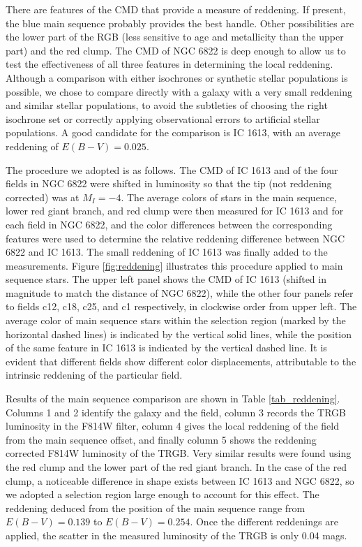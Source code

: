 \documentclass[11pt,preprint2]{aastex}
\begin{document}
There are features of the CMD that provide a measure of reddening. If present, the blue main sequence probably provides the best handle. Other possibilities are the lower part of the RGB (less sensitive to age and metallicity than the upper part) and the red clump. The CMD of NGC 6822 is deep enough to allow us to test the effectiveness of all three features in determining the local reddening. Although a comparison with either isochrones or synthetic stellar populations is possible, we chose to compare directly with a galaxy with a very small reddening and similar stellar populations, to avoid the subtleties of choosing the right isochrone set or correctly applying observational errors to artificial stellar populations. A good candidate for the comparison is IC 1613, with an average reddening of $E(B-V)=0.025$. 

The procedure we adopted is as follows. The CMD of IC 1613 and of the four fields in NGC 6822 were shifted in luminosity so that the tip (not reddening corrected) was at $M_I=-4$. The average colors of stars in the main sequence, lower red giant branch, and red clump were then measured for IC 1613 and for each field in NGC 6822, and the color differences between the corresponding features were used to determine the relative reddening difference between NGC 6822 and IC 1613. The small reddening of IC 1613 was finally added to the measurements. 
Figure \ref{fig:reddening} illustrates this procedure applied to main sequence stars. The upper left panel shows the CMD of IC 1613 (shifted in magnitude to match the distance of NGC 6822), while the other four panels refer to fields c12, c18, c25, and c1 respectively, in clockwise order from upper left. The average color of main sequence stars within the selection region (marked by the horizontal dashed lines) is indicated by the vertical solid lines, while the position of the same feature in IC 1613 is indicated by the vertical dashed line. It is evident that different fields show different color displacements, attributable to the intrinsic reddening of the particular field.

Results  of the main sequence comparison are shown in Table \ref{tab_reddening}. Columns 1 and 2 identify the galaxy and the field, column 3 records the TRGB luminosity in the F814W filter, column 4 gives the local reddening of the field from the main sequence offset, and finally column 5 shows the reddening corrected F814W luminosity of the TRGB. Very similar results were found using the red clump and the lower part of the red giant branch. In the case of the red clump, a noticeable difference in shape exists between IC 1613 and NGC 6822, so we adopted a selection region large enough to account for this effect. The reddening deduced from the position of the main sequence range from $E(B-V)=0.139$ to $E(B-V)=0.254$. Once the different reddenings are applied, the scatter in the measured luminosity of the TRGB is only 0.04 mags.
\end{document}
